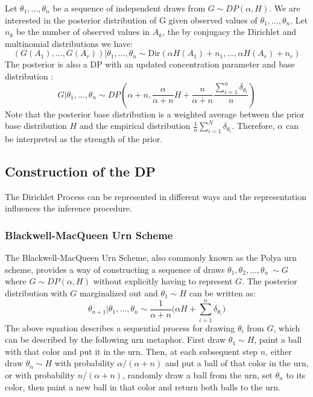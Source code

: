 Let $\theta_1,...,\theta_n$ be a sequence of independent draws from $G\sim DP(\alpha,H)$. We are interested in the posterior distribution of G given observed values of $\theta_1,...,\theta_n$. Let $n_k$ be the number of observed values in $A_k$, the by conjugacy the Dirichlet and multinomial distributions we have:
\begin{equation}
    (G(A_1),...,G(A_r))|\theta_1,...,\theta_n \sim \mathrm{Dir}(\alpha H(A_1)+n_1,...,\alpha H(A_r)+n_r)
\end{equation}
The posterior is also a DP with an updated concentration parameter and base distribution \cite{Teh2010a}:
\begin{equation}\label{equ:dp_posterior}
    G|\theta_1,...,\theta_n \sim DP(\alpha+n, \frac{\alpha}{\alpha+n}H + \frac{n}{\alpha+n}\frac{\sum_{i=1}^{n}\delta_{\theta_i}}{n})
\end{equation}
Note that the posterior base distribution is a weighted average between the prior base distribution $H$ and the empirical distribution $\frac{1}{n}\sum_{i=1}^{N}\delta_{\theta_i}$. Therefore, $\alpha$ can be interpreted as the strength of the prior. 

\subsection{Construction of the DP}

The Dirichlet Process can be represented in different ways and the representation influences the inference procedure.

\subsubsection{Blackwell-MacQueen Urn Scheme}

The Blackwell-MacQueen Urn Scheme, also commonly known as the Polya urn scheme, provides a way of constructing a sequence of draws $\theta_1, \theta_2,...,\theta_n~\sim G$ where $G\sim DP(\alpha, H)$ without explicitly having to represent $G$. The posterior distribution with $G$ marginalized out and $\theta_1 \sim H$ can be written as:
\begin{equation}\label{equ:urn}
    \theta_{n+1}|\theta_1,...,\theta_n \sim \frac{1}{\alpha+n}\bigg(\alpha H + \sum_{i=1}^{n}\delta_{\theta_i}\bigg)
\end{equation}
The above equation describes a sequential process for drawing $\theta_i$ from $G$, which can be described by the following urn metaphor. First draw $\theta_1 \sim H$, paint a ball with that color and put it in the urn. Then, at each subsequent step $n$, either draw $\theta_n \sim H$ with probability $\alpha/(\alpha + n)$ and put a ball of that color in the urn, or with probability $n/(\alpha + n)$, randomly draw a ball from the urn, set $\theta_n$ to its color, then paint a new ball in that color and return both balls to the urn.

